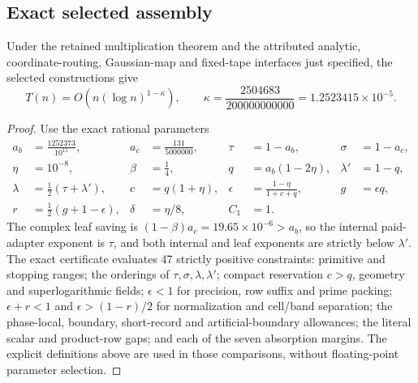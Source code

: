\subsection{Exact selected assembly}
\begin{theorem}
Under the retained multiplication theorem and the attributed analytic,
coordinate-routing, Gaussian-map and fixed-tape interfaces just
specified, the selected constructions give
\[
 T(n)=O\!\left(n(\log n)^{1-\kappa}\right),\qquad
 \boxed{\kappa=\frac{2504683}{200000000000}
                   =1.2523415\times10^{-5}}.
\]
\end{theorem}
\begin{proof}
Use the exact rational parameters
\[
\begin{aligned}
 a_b&=\frac{1252373}{10^{11}},&a_c&=\frac{131}{5000000},&
 \tau&=1-a_b,&\sigma&=1-a_c,\\
 \eta&=10^{-8},&\beta&=\tfrac14,&q&=a_b(1-2\eta),&
 \lambda'&=1-q,\\
 \lambda&=\tfrac12(\tau+\lambda'),&c&=q(1+\eta),&
 \epsilon&=\frac{1-\eta}{1+c+q},&g&=\epsilon q,\\
 r&=\tfrac12(g+1-\epsilon),&\delta&=\eta/8,&C_1&=1.
\end{aligned}
\]
The complex leaf saving is $(1-\beta)a_c=19.65\times10^{-6}>a_b$,
so the internal paid-adapter exponent is $\tau$, and both internal
and leaf exponents are strictly below $\lambda'$.
The exact certificate evaluates 47 strictly positive constraints:
primitive and stopping ranges; the orderings of $\tau,\sigma,
\lambda,\lambda'$; compact reservation $c>q$, geometry and
superlogarithmic fields; $\epsilon<1$ for precision, row suffix and
prime packing; $\epsilon+r<1$ and
$\epsilon>(1-r)/2$ for normalization and cell/band separation;
the phase-local, boundary, short-record and artificial-boundary
allowances; the literal scalar and product-row gaps; and each of the
seven absorption margins. The explicit definitions above are used in
those comparisons, without floating-point parameter selection.


\end{proof}
